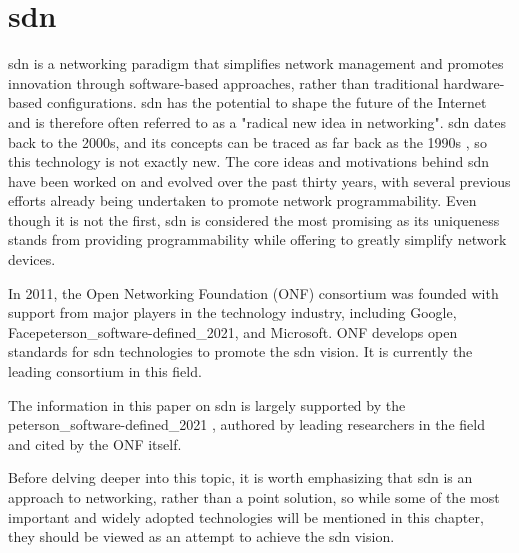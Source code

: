 
%

\chapter[Software Defined Networking]{\acrlong{sdn}} %
\label{cha:sdn}


\gls{sdn} is a networking paradigm that simplifies network management and promotes innovation through software-based approaches, rather than traditional hardware-based configurations. \gls{sdn} has the potential to shape the future of the Internet and is therefore often referred to as a "radical new idea in networking". \cite{nunes_survey_2014}
\gls{sdn} dates back to the 2000s, and its concepts can be traced as far back as the 1990s \cite{feamster_road_2013}, so this technology is not exactly new. The core ideas and motivations behind \gls{sdn} have been worked on and evolved over the past thirty years, with several previous efforts already being undertaken to promote network programmability\cite{feamster_road_2013}. Even though it is not the first, \gls{sdn} is considered the most promising as its uniqueness stands from providing programmability while offering to greatly simplify network devices. \cite{xia_survey_2015} 

In 2011, the Open Networking Foundation (ONF) consortium was founded with support from major players in the technology industry, including Google, Facepeterson_software-defined_2021, and Microsoft. ONF develops open standards for \gls{sdn} technologies to promote the \gls{sdn} vision. It is currently the leading consortium in this field. \cite{noauthor_open_nodate} 

The information in this paper on \gls{sdn} is largely supported by the peterson_software-defined_2021 \cite{peterson_software-defined_2021}, authored by leading researchers in the field and cited by the ONF itself.

Before delving deeper into this topic, it is worth emphasizing that \gls{sdn} is an approach to networking, rather than a point solution, so while some of the most important and widely adopted technologies will be mentioned in this chapter, they should be viewed as an attempt to achieve the \gls{sdn} vision.


